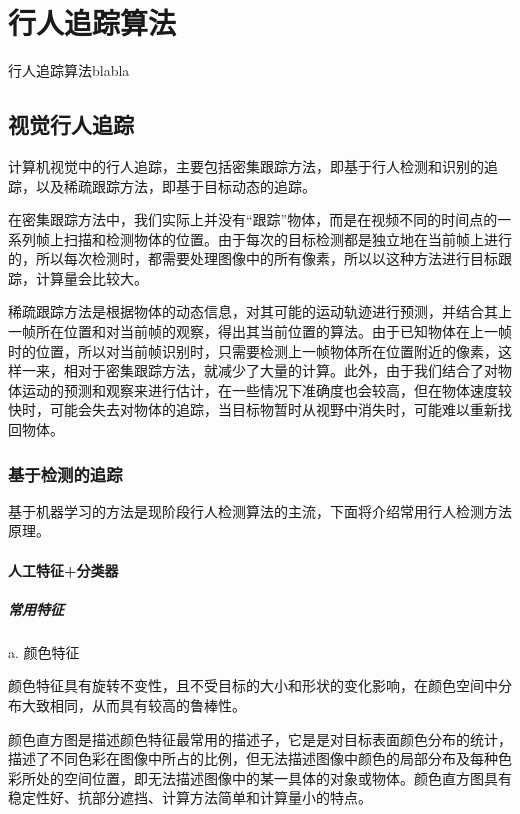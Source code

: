 
\chapter{行人追踪算法}
  行人追踪算法blabla

  
\section{视觉行人追踪}
  计算机视觉中的行人追踪，主要包括密集跟踪方法，即基于行人检测和识别的追踪，以及稀疏跟踪方法，即基于目标动态的追踪。

  在密集跟踪方法中，我们实际上并没有“跟踪”物体，而是在视频不同的时间点的一系列帧上扫描和检测物体的位置。由于每次的目标检测都是独立地在当前帧上进行的，所以每次检测时，都需要处理图像中的所有像素，所以以这种方法进行目标跟踪，计算量会比较大。

  稀疏跟踪方法是根据物体的动态信息，对其可能的运动轨迹进行预测，并结合其上一帧所在位置和对当前帧的观察，得出其当前位置的算法。由于已知物体在上一帧时的位置，所以对当前帧识别时，只需要检测上一帧物体所在位置附近的像素，这样一来，相对于密集跟踪方法，就减少了大量的计算。此外，由于我们结合了对物体运动的预测和观察来进行估计，在一些情况下准确度也会较高，但在物体速度较快时，可能会失去对物体的追踪，当目标物暂时从视野中消失时，可能难以重新找回物体。

\subsection{基于检测的追踪}
  基于机器学习的方法是现阶段行人检测算法的主流，下面将介绍常用行人检测方法原理。

\subsubsection{人工特征+分类器}
\paragraph{常用特征}
  a. 颜色特征

  颜色特征具有旋转不变性，且不受目标的大小和形状的变化影响，在颜色空间中分布大致相同，从而具有较高的鲁棒性。

  颜色直方图是描述颜色特征最常用的描述子，它是是对目标表面颜色分布的统计，描述了不同色彩在图像中所占的比例，但无法描述图像中颜色的局部分布及每种色彩所处的空间位置，即无法描述图像中的某一具体的对象或物体。颜色直方图具有稳定性好、抗部分遮挡、计算方法简单和计算量小的特点。

